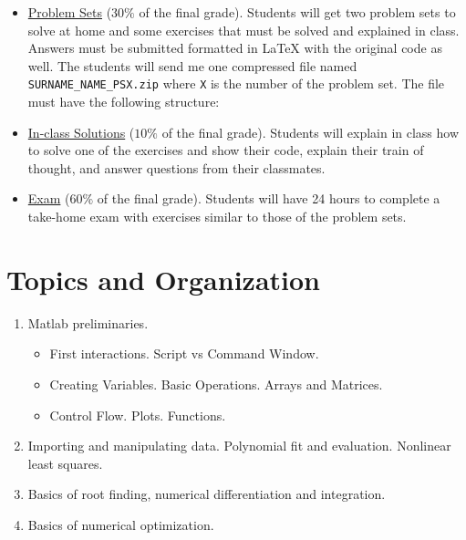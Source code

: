 \documentclass[a4paper,12pt]{article}
\begin{document}
\begin{itemize}
    \item \underline{Problem Sets} ($30\%$ of the final grade).
    Students will get two problem sets to solve at home and some exercises that must be solved and explained in class. Answers must be submitted formatted in { \LaTeX } with the original code as well. The students will send me one compressed file named \verb+SURNAME_NAME_PSX.zip+ where \verb+X+ is the number of the problem set. The file must have the following structure:
    
    \begin{minipage}[c]{0.8\textwidth}
    \end{minipage}
    \item \underline{In-class Solutions} ($10\%$ of the final grade). Students will explain in class how to solve one of the exercises and show their code, explain their train of thought, and answer questions from their classmates.
    \item \underline{Exam} ($60\%$ of the final grade). Students will have 24 hours to complete a take-home exam with exercises similar to those of the problem sets.
\end{itemize}

\section{Topics and Organization}

\begin{enumerate}[label={\textbf{Session \arabic*}}]
    \item Matlab preliminaries. 
    \begin{itemize}
        \item First interactions. Script vs Command Window.
        \item Creating Variables. Basic Operations. Arrays and Matrices.
        \item Control Flow. Plots. Functions.
    \end{itemize}
    \item Importing and manipulating data. Polynomial fit and evaluation. Nonlinear least squares.
    \item Basics of root finding, numerical differentiation and integration.
    \item Basics of numerical optimization.
\end{enumerate}
\end{document}
